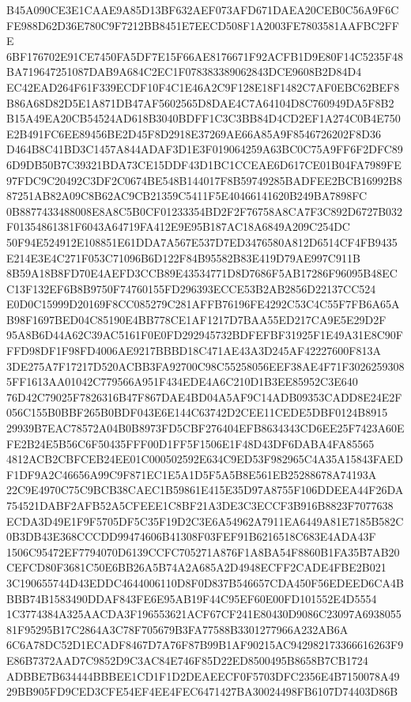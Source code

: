 \documentclass[UTF8,fontset=fandol,zihao=-4,a4paper]{ctexart}
\begin{document}
{{B45A090CE3E1CAAE9A85D13BF632AEF073AFD671DAEA20CEB0C56A9F6CFE988D62D36E780C9F7212BB8451E7EECD508F1A2003FE7803581AAFBC2FFE
6BF176702E91CE7450FA5DF7E15F66AE8176671F92ACFB1D9E80F14C5235F48BA719647251087DAB9A684C2EC1F078383389062843DCE9608B2D84D4
EC42EAD264F61F339ECDF10F4C1E46A2C9F128E18F1482C7AF0EBC62BEF8B86A68D82D5E1A871DB47AF5602565D8DAE4C7A64104D8C760949DA5F8B2
B15A49EA20CB54524AD618B3040BDFF1C3C3BB84D4CD2EF1A274C0B4E750E2B491FC6EE89456BE2D45F8D2918E37269AE66A85A9F8546726202F8D36
D464B8C41BD3C1457A844ADAF3D1E3F019064259A63BC0C75A9FF6F2DFC896D9DB50B7C39321BDA73CE15DDF43D1BC1CCEAE6D617CE01B04FA7989FE
97FDC9C20492C3DF2C0674BE548B144017F8B59749285BADFEE2BCB16992B887251AB82A09C8B62AC9CB21359C5411F5E40466141620B249BA7898FC
0B8877433488008E8A8C5B0CF01233354BD2F2F76758A8CA7F3C892D6727B032F01354861381F6043A64719FA412E9E95B187AC18A6849A209C254DC
50F94E524912E108851E61DDA7A567E537D7ED3476580A812D6514CF4FB9435E214E3E4C271F053C71096B6D122F84B95582B83E419D79AE997C911B
8B59A18B8FD70E4AEFD3CCB89E43534771D8D7686F5AB17286F96095B48ECC13F132EF6B8B9750F74760155FD296393ECCE53B2AB2856D22137CC524
E0D0C15999D20169F8CC085279C281AFFB76196FE4292C53C4C55F7FB6A65AB98F1697BED04C85190E4BB778CE1AF1217D7BAA55ED217CA9E5E29D2F
95A8B6D44A62C39AC5161F0E0FD292945732BDFEFBF31925F1E49A31E8C90FFFD98DF1F98FD4006AE9217BBBD18C471AE43A3D245AF42227600F813A
3DE275A7F17217D520ACBB3FA92700C98C55258056EEF38AE4F71F30262593085FF1613AA01042C779566A951F434EDE4A6C210D1B3EE85952C3E640
76D42C79025F7826316B47F867DAE4BD04A5AF9C14ADB09353CADD8E24E2F056C155B0BBF265B0BDF043E6E144C63742D2CEE11CEDE5DBF0124B8915
29939B7EAC78572A04B0B8973FD5CBF276404EFB8634343CD6EE25F7423A60EFE2B24E5B56C6F50435FFF00D1FF5F1506E1F48D43DF6DABA4FA85565
4812ACB2CBFCEB24EE01C000502592E634C9ED53F982965C4A35A15843FAEDF1DF9A2C46656A99C9F871EC1E5A1D5F5A5B8E561EB25288678A74193A
22C9E4970C75C9BCB38CAEC1B59861E415E35D97A8755F106DDEEA44F26DA754521DABF2AFB52A5CFEEE1C8BF21A3DE3C3ECCF3B916B8823F7077638
ECDA3D49E1F9F5705DF5C35F19D2C3E6A54962A7911EA6449A81E7185B582C0B3DB43E368CCCDD99474606B41308F03FEF91B6216518C683E4ADA43F
1506C95472EF7794070D6139CCFC705271A876F1A8BA54F8860B1FA35B7AB20CEFCD80F3681C50E6BB26A5B74A2A685A2D4948ECFF2CADE4FBE2B021
3C190655744D43EDDC4644006110D8F0D837B546657CDA450F56EDEED6CA4BBBB74B1583490DDAF843FE6E95AB19F44C95EF60E00FD101552E4D5554
1C3774384A325AACDA3F196553621ACF67CF241E80430D9086C23097A693805581F95295B17C2864A3C78F705679B3FA77588B3301277966A232AB6A
6C6A78DC52D1ECADF8467D7A76F87B99B1AF90215AC942982173366616263F9E86B7372AAD7C9852D9C3AC84E746F85D22ED8500495B8658B7CB1724
ADBBE7B634444BBBEE1CD1F1D2DEAEECF0F5703DFC2356E4B7150078A4929BB905FD9CED3CFE54EF4EE4FEC6471427BA30024498FB6107D74403D86B
}}
\end{document}
